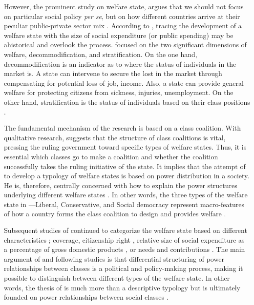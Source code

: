\documentclass[11pt]{article}
\begin{document}
However, the prominent study on welfare state, \citet{Gosta1990} argues that we should not focus on particular social policy \textit{per se}, but on how different countries arrive at their peculiar public-private sector mix \citep[2]{Gosta1990}. According to \citet{Gosta1990}, tracing the development of a welfare state with the size of social expenditure (or public spending) may be ahistorical and overlook the process. \citet{Gosta1990} focused on the two significant dimensions of welfare, decommodification, and stratification. On the one hand, decommodification is an indicator as to where the status of individuals in the market is. A state can intervene to secure the lost in the market through compensating for potential loss of job, income. Also, a state can provide general welfare for protecting citizens from sickness, injuries, unemployment. On the other hand, stratification is the status of individuals based on their class positions \citep{Gosta1990}.\par

The fundamental mechanism of the research is based on a class coalition. With qualitative research, \citet{Gosta1990} suggests that the structure of class coalitions is vital, pressing the ruling government toward specific types of welfare states. Thus, it is essential which classes go to make a coalition and whether the coalition successfully takes the ruling initiative of the state. It implies that the attempt of \citet{Gosta1990} to develop a typology of welfare states is based on power distribution in a society. He is, therefore, centrally concerned with how to explain the power structures underlying different welfare states \citep[88]{Kemeny1995}. In other words, the three types of the welfare state in \citet{Gosta1990}---Liberal, Conservative, and Social democracy represent macro-features of how a country forms the class coalition to design and provides welfare \citep[646]{Scruggs2008}.

Subsequent studies of \citet{Gosta1990} continued to categorize the welfare state based on different characteristics \citep[14]{Arcanjo2006}; coverage, citizenship right \citep{Ferrera1996}, relative size of social expenditure as a percentage of gross domestic products \citep{Bonoli1997}, or needs and contributions \citep{Korpi1998}. The main argument of \citet{Gosta1990} and following studies is that differential structuring of power relationships between classes is a political and policy-making process, making it possible to distinguish between different types of the welfare state. In other words, the thesis of \citet{Gosta1990} is much more than a descriptive typology but is ultimately founded on power relationships between social classes \citep[89]{Kemeny1995}.\par
\end{document}
